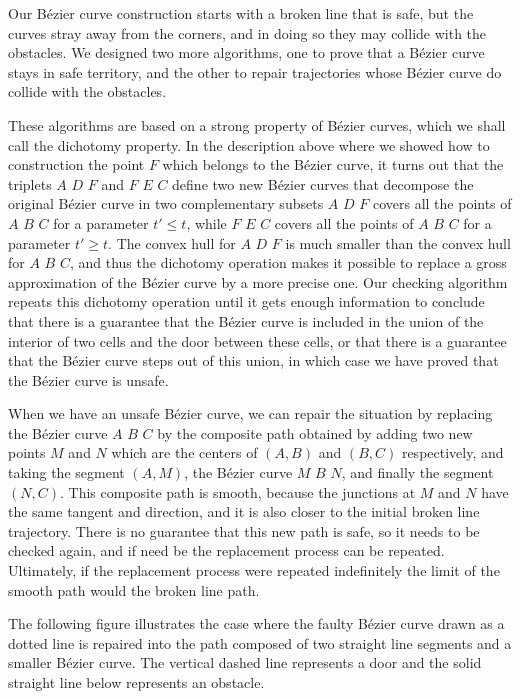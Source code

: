 \documentclass{easychair}
\begin{document}
Our Bézier curve construction starts with a broken line that is safe,
but the curves stray away from the corners, and in doing so they may
collide with the obstacles.  We designed two more algorithms, one to prove
that a Bézier curve stays in safe territory, and the other to repair
trajectories whose Bézier curve do collide with the obstacles.

These algorithms are based on a strong property of Bézier curves,
which we shall call the dichotomy property.  In the description above
where we showed how to construction the point \(F\) which belongs to
the Bézier curve, it turns out that the triplets \(A\) \(D\) \(F\) and
\(F\) \(E\) \(C\) define two new Bézier curves that decompose the
original Bézier curve in two complementary subsets \(A\) \(D\) \(F\)
covers all the points of \(A\) \(B\) \(C\) for a parameter \(t' \leq
t\), while \(F\) \(E\) \(C\) covers all the points of \(A\) \(B\)
\(C\) for a parameter \(t'\geq t\).  The convex hull for \(A\) \(D\)
\(F\) is much smaller than the convex hull for \(A\) \(B\) \(C\), and
thus the dichotomy operation makes it possible to replace a gross
approximation of the Bézier curve by a more precise one.  Our checking
algorithm repeats this dichotomy operation until it gets enough
information to conclude that there is a guarantee that the Bézier curve
is included in the union of the interior of two cells and the door
between these cells, or that there is a guarantee that the Bézier curve
steps out of this union, in which case we have proved that the Bézier
curve is unsafe.

When we have an unsafe Bézier curve, we can repair the situation by
replacing the Bézier curve \(A\) \(B\) \(C\) by the composite path
obtained by adding two new points \(M\) and \(N\) which are the
centers of \((A,B)\) and \((B,C)\) respectively, and taking the
segment \((A,M)\), the Bézier curve \(M\) \(B\) \(N\), and finally the
segment \((N, C)\).  This composite path is smooth, because the
junctions at \(M\) and \(N\) have the same tangent and direction, and
it is also closer to the initial broken line trajectory.  There is no
guarantee that this new path is safe, so it needs to be checked again,
and if need be the replacement process can be repeated.  Ultimately,
if the replacement process were repeated indefinitely the limit of the
smooth path would the broken line path.

The following figure illustrates the case where the faulty Bézier
curve drawn as a dotted line is repaired into the path composed of two
straight line segments and a smaller Bézier curve.  The vertical
dashed line represents a door and the solid straight line below
represents an obstacle.
\end{document}
